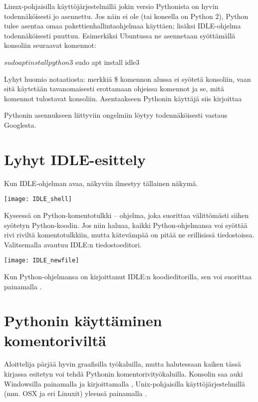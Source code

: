 Linux-pohjaisilla käyttöjärjestelmillä jokin versio Pythonista on hyvin todennäköisesti jo asennettu. Jos näin ei ole (tai koneella on Python 2), Python tulee asentaa omaa pakettienhallintaohjelmaa käyttäen; lisäksi IDLE-ohjelma todennäköisesti puuttuu. Esimerkiksi Ubuntussa ne asennetaan syöttämällä konsoliin seuraavat komennot:

\begin{bash}
$ sudo apt install python3
$ sudo apt install idle3
\end{bash}

Lyhyt huomio notaatiosta: merkkiä $\$$ komennon alussa ei syötetä konsoliin, vaan sitä käytetään tavanomaisesti erottamaan ohjeissa komennot ja se, mitä komennot tulostavat konsoliin. Asentaakseen Pythonin käyttäjä siis kirjoittaa 

Pythonin asennukseen liittyviin ongelmiin löytyy todennäköisesti vastaus Googlesta.

\section{Lyhyt IDLE-esittely}

Kun \gls{IDLE}-ohjelman avaa, näkyviin ilmestyy tällainen näkymä.

\texttt{[image: IDLE\_shell]}

Kyseessä on Python-\gls{komentotulkki} -- ohjelma, joka suorittaa välittömästi siihen syötetyn Python-koodin. Jos niin haluaa, kaikki Python-ohjelmansa voi syöttää rivi riviltä komentotulkkiin, mutta kätevämpää on pitää ne erillisissä tiedostoissa. Valitsemalla  avautuu IDLE:n tiedostoeditori.

\texttt{[image: IDLE\_newfile]}

Kun Python-ohjelmansa on kirjoittanut IDLE:n koodieditorilla, sen voi suorittaa painamalla .

\section{Pythonin käyttäminen komentoriviltä}

Aloittelija pärjää hyvin graafisilla työkaluilla, mutta halutessaan kaiken tässä kirjassa esitetyn voi tehdä Pythonin komentorivityökaluilla. Konsolin saa auki Windowsilla painamalla  ja kirjoittamalla , Unix-pohjaisilla käyttöjärjestelmillä (mm. OSX ja eri Linuxit) yleensä painamalla .

